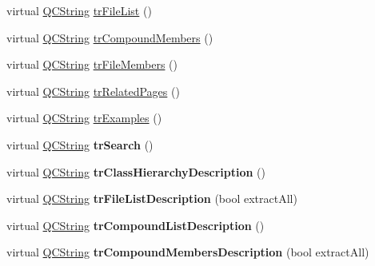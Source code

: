 \begin{DoxyCompactItemize}
\item 
virtual \mbox{\hyperlink{class_q_c_string}{Q\+C\+String}} \mbox{\hyperlink{class_translator_chinese_a229e10b54649dca1749009588af44456}{tr\+File\+List}} ()
\item 
virtual \mbox{\hyperlink{class_q_c_string}{Q\+C\+String}} \mbox{\hyperlink{class_translator_chinese_a8676dac1d6a58f11fc47f6a177910650}{tr\+Compound\+Members}} ()
\item 
virtual \mbox{\hyperlink{class_q_c_string}{Q\+C\+String}} \mbox{\hyperlink{class_translator_chinese_af147a641f6b582b15e54027a4637d453}{tr\+File\+Members}} ()
\item 
virtual \mbox{\hyperlink{class_q_c_string}{Q\+C\+String}} \mbox{\hyperlink{class_translator_chinese_ac6885fb75068c0f8db3955f6f79a7179}{tr\+Related\+Pages}} ()
\item 
virtual \mbox{\hyperlink{class_q_c_string}{Q\+C\+String}} \mbox{\hyperlink{class_translator_chinese_a646a38b296d5f3976f71a2cac754f535}{tr\+Examples}} ()
\item 
\mbox{\label{class_translator_chinese_abadfd25fc39a6cf58cf8da32f975a5e1}} 
virtual \mbox{\hyperlink{class_q_c_string}{Q\+C\+String}} {\bfseries tr\+Search} ()
\item 
\mbox{\label{class_translator_chinese_a1c85e570526547a26b0d717919f3d71f}} 
virtual \mbox{\hyperlink{class_q_c_string}{Q\+C\+String}} {\bfseries tr\+Class\+Hierarchy\+Description} ()
\item 
\mbox{\label{class_translator_chinese_af87e157ad5af7850fd8e1aed3b6d47bf}} 
virtual \mbox{\hyperlink{class_q_c_string}{Q\+C\+String}} {\bfseries tr\+File\+List\+Description} (bool extract\+All)
\item 
\mbox{\label{class_translator_chinese_a8eb1fb40dc2095d24629298f85cc66a5}} 
virtual \mbox{\hyperlink{class_q_c_string}{Q\+C\+String}} {\bfseries tr\+Compound\+List\+Description} ()
\item 
\mbox{\label{class_translator_chinese_aeac6e64defbd6ffe004328c7e53b4494}} 
virtual \mbox{\hyperlink{class_q_c_string}{Q\+C\+String}} {\bfseries tr\+Compound\+Members\+Description} (bool extract\+All)
\item 
\mbox{\label{class_translator_chinese_a6b5374abb3c2a7f16ef334c75904a58d}} 

\end{DoxyCompactItemize}
